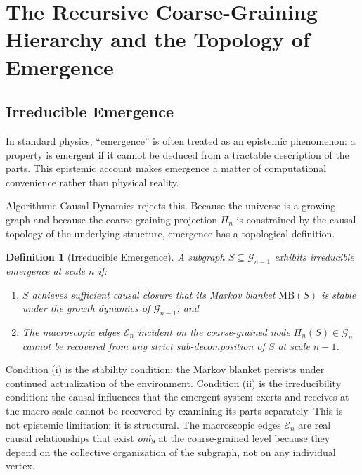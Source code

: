 \documentclass[11pt,a4paper]{article}
\newtheorem{definition}[theorem]{Definition}
\theoremstyle{remark}
\newcommand{\MB}{\mathrm{MB}}
\newcommand{\GG}{\mathcal{G}}
\newcommand{\EE}{\mathcal{E}}
\begin{document}
\section{The Recursive Coarse-Graining Hierarchy and the Topology of Emergence}
\label{sec:hierarchy}

\subsection{Irreducible Emergence}

In standard physics, ``emergence'' is often treated as an epistemic phenomenon:
a property is emergent if it cannot be deduced from a tractable description of
the parts. This epistemic account makes emergence a matter of computational
convenience rather than physical reality.

Algorithmic Causal Dynamics rejects this. Because the universe is a growing graph
and because the coarse-graining projection $\Pi_n$ is constrained by the causal
topology of the underlying structure, emergence has a topological definition.

\begin{definition}[Irreducible Emergence]
A subgraph $S \subseteq \GG_{n-1}$ exhibits \emph{irreducible emergence} at
scale $n$ if:
\begin{enumerate}[noitemsep,label=(\roman*)]
  \item $S$ achieves sufficient causal closure that its Markov blanket
    $\MB(S)$ is stable under the growth dynamics of $\GG_{n-1}$; and
  \item The macroscopic edges $\EE_n$ incident on the coarse-grained node
    $\Pi_n(S) \in \GG_n$ cannot be recovered from any strict sub-decomposition
    of $S$ at scale $n-1$.
\end{enumerate}
\end{definition}

Condition (i) is the stability condition: the Markov blanket persists under
continued actualization of the environment. Condition (ii) is the irreducibility
condition: the causal influences that the emergent system exerts and receives at
the macro scale cannot be recovered by examining its parts separately. This is
not epistemic limitation; it is structural. The macroscopic edges $\EE_n$ are
real causal relationships that exist \emph{only} at the coarse-grained level
because they depend on the collective organization of the subgraph, not on any
individual vertex.
\end{document}
